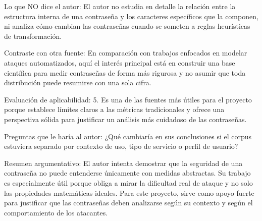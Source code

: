 \documentclass[12pt, letterpaper]{article}
\begin{document}
\noindent
Lo que NO dice el autor: El autor no estudia en detalle la relación entre la estructura interna de una contraseña y los caracteres específicos que la componen, ni analiza cómo cambian las contraseñas cuando se someten a reglas heurísticas de transformación. \newline

\noindent
Contraste con otra fuente: En comparación con trabajos enfocados en modelar ataques automatizados, aquí el interés principal está en construir una base científica para medir contraseñas de forma más rigurosa y no asumir que toda distribución puede resumirse con una sola cifra.   \newline 

\noindent
Evaluación de aplicabilidad: 5. Es una de las fuentes más útiles para el proyecto porque establece límites claros a las métricas tradicionales y ofrece una perspectiva sólida para justificar un análisis más cuidadoso de las contraseñas. \newline

\noindent
Preguntas que le haría al autor: ¿Qué cambiaría en sus conclusiones si el corpus estuviera separado por contexto de uso, tipo de servicio o perfil de usuario? \newline

\noindent
Resumen argumentativo: El autor intenta demostrar que la seguridad de una contraseña no puede entenderse únicamente con medidas abstractas. Su trabajo es especialmente útil porque obliga a mirar la dificultad real de ataque y no solo las propiedades matemáticas ideales. Para este proyecto, sirve como apoyo fuerte para justificar que las contraseñas deben analizarse según su contexto y según el comportamiento de los atacantes.
\end{document}
